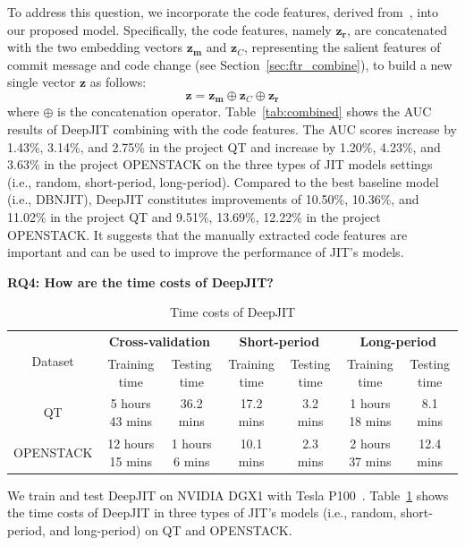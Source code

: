 To address this question, we incorporate the code features, derived from~\cite{mcintosh2018fix}, into our proposed model. Specifically, the code features, namely $\textbf{z}_\textbf{r}$, are concatenated with the two embedding vectors  $\textbf{z}_\textbf{m}$ and $\textbf{z}_C$, representing the salient features of commit message and code change (see Section~\ref{sec:ftr_combine}), to build a new single vector $\textbf{z}$ as follows:
\begin{equation}
\label{eq:combined_ftr}
\textbf{z} = \textbf{z}_\textbf{m} \oplus \textbf{z}_C \oplus \textbf{z}_\textbf{r}
\end{equation}
where $\oplus$ is the concatenation operator. Table~\ref{tab:combined} shows the AUC results of DeepJIT combining with the code features. The AUC scores increase by 1.43\%, 3.14\%, and 2.75\% in the project QT and increase by 1.20\%, 4.23\%, and 3.63\% in the project OPENSTACK on the three types of JIT models settings (i.e., random, short-period, long-period). Compared to the best baseline model (i.e., DBNJIT), DeepJIT constitutes improvements of 10.50\%, 10.36\%, and 11.02\% in the project QT and 9.51\%, 13.69\%, 12.22\% in the project OPENSTACK. It suggests that the manually extracted code features are important and can be used to improve the performance of JIT's models.

\noindent \textbf{RQ4: How are the time costs of DeepJIT?}
\begin{table}[t!]
  \centering
  \caption{Time costs of DeepJIT}
    \begin{tabular}{|c|c|c|c|c|c|c|}
    \hline
    \multicolumn{1}{|c|}{\multirow{2}[4]{*}{Dataset}} & \multicolumn{2}{c|}{\textbf{Cross-validation}} & \multicolumn{2}{c|}{\textbf{Short-period}} & \multicolumn{2}{c|}{\textbf{Long-period}} \\
\cline{2-7}          & Training time & Testing time & Training time & Testing time & Training time & Testing time \\
    \hline
    \hline
    QT    & 5 hours 43 mins & 36.2 mins & 17.2 mins & 3.2 mins & 1 hours 18 mins & 8.1 mins \\
    \hline
    OPENSTACK & 12 hours 15 mins & 1 hours 6 mins & 10.1 mins & 2.3 mins & 2 hours 37 mins & 12.4 mins \\
    \hline
    \end{tabular}%
  \label{tab:cost}%
\end{table}%

We train and test DeepJIT on NVIDIA DGX1 with Tesla P100~\cite{gawande2018scaling}. Table~\ref{tab:cost} shows the time costs of DeepJIT in three types of JIT's models (i.e., random, short-period, and long-period) on QT and OPENSTACK. 


